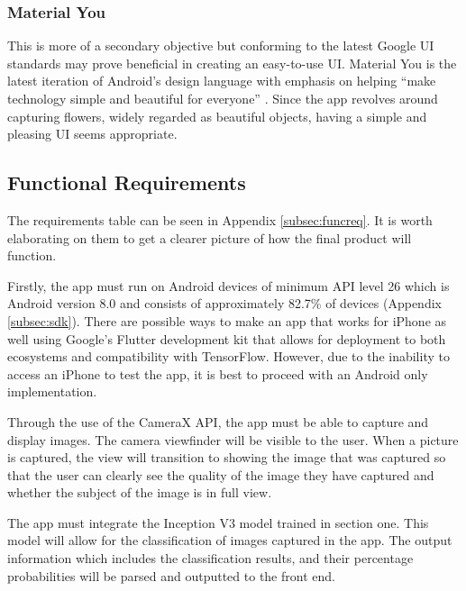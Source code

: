 \documentclass[12pt,a4paper]{report}
\begin{document}
\subsubsection{Material You}

This is more of a secondary objective but conforming to the latest Google UI standards may prove beneficial in creating 
an easy-to-use UI. Material You is the latest iteration of Android's design language with emphasis on helping “make 
technology simple and beautiful for everyone” \citep{material}. Since the app revolves around capturing flowers, widely 
regarded as beautiful objects, having a simple and pleasing UI seems appropriate. 

\subsection{Functional Requirements}

The requirements table can be seen in Appendix \ref{subsec:funcreq}. It is worth elaborating on them to get a clearer 
picture of how the final product will function. 

\par

Firstly, the app must run on Android devices of minimum API level 26 which is Android version 8.0 and 
consists of approximately 82.7\% of devices (Appendix \ref{subsec:sdk}). 
There are possible ways to make an app that works for iPhone as well using Google's Flutter development kit that allows 
for deployment to both ecosystems and compatibility with TensorFlow. However, due to the inability to access an iPhone 
to test the app, it is best to proceed with an Android only implementation.

\par

Through the use of the CameraX API, the app must be able to capture and display images. The camera viewfinder will be 
visible to the user. When a picture is captured, the view will transition to showing the image that was captured so 
that the user can clearly see the quality of the image they have captured and whether the subject of the image is in 
full view.

\par

The app must integrate the Inception V3 model trained in section one. This model will allow for the classification of 
images captured in the app. The output information which includes the classification results, and their percentage 
probabilities will be parsed and outputted to the front end.
\end{document}
